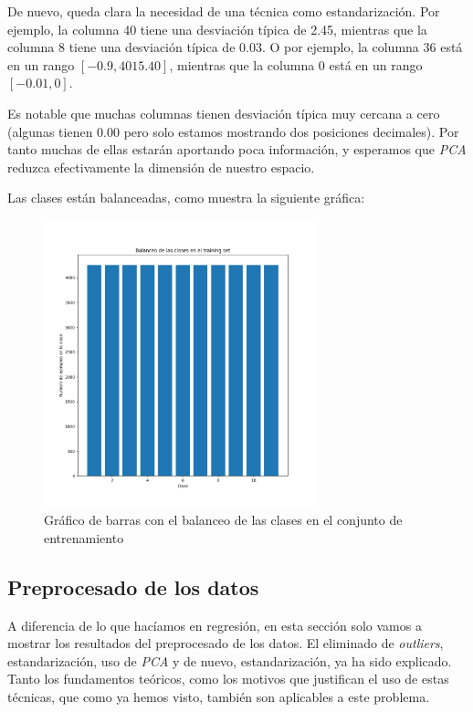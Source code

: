 \documentclass[11pt]{article}
\begin{document}
De nuevo, queda clara la necesidad de una técnica como estandarización. Por ejemplo, la columna 40 tiene una desviación típica de 2.45, mientras que la columna 8 tiene una desviación típica de 0.03. O por ejemplo, la columna 36 está en un rango $[-0.9, 4015.40]$, mientras que la columna 0 está en un rango $[-0.01, 0]$.

Es notable que muchas columnas tienen desviación típica muy cercana a cero (algunas tienen 0.00 pero solo estamos mostrando dos posiciones decimales). Por tanto muchas de ellas estarán aportando poca información, y esperamos que \emph{PCA} reduzca efectivamente la dimensión de nuestro espacio.

Las clases están balanceadas, como muestra la siguiente gráfica:

\begin{figure}[H]
    \centering
    \includegraphics[width=0.7\textwidth]{balanced_classes}
    \caption{Gráfico de barras con el balanceo de las clases en el conjunto de entrenamiento}
\end{figure}

\pagebreak
\subsection{Preprocesado de los datos}

A diferencia de lo que hacíamos en regresión, en esta sección solo vamos a mostrar los resultados del preprocesado de los datos. El eliminado de \emph{outliers}, estandarización, uso de \emph{PCA} y de nuevo, estandarización, ya ha sido explicado. Tanto los fundamentos teóricos, como los motivos que justifican el uso de estas técnicas, que como ya hemos visto, también son aplicables a este problema.
\end{document}

